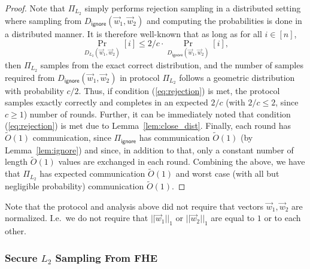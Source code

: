 \begin{proof}
Note that $\Pi_{L_2}$ simply performs rejection sampling in a distributed setting where sampling from $D_{\mathsf{ignore}}(\vec{w}_1, \vec{w}_2)$ and computing the probabilities is done in a distributed manner. It is therefore well-known that
as long as for all $i \in [n]$,
\begin{equation} \label{eq:rejection}
    \Pr_{D_{L_2}(\vec{w}_1, \vec{w}_2)}[i] \leq 2/c \cdot \Pr_{D_{\mathsf{ignore}}(\vec{w}_1, \vec{w}_2)}[i],
\end{equation}
then $\Pi_{L_2}$ samples from the exact correct distribution, and
the number of samples required from $D_{\mathsf{ignore}}(\vec{w}_1, \vec{w}_2)$ in protocol $\Pi_{L_2}$ follows a geometric distribution with probability $c/2$.
Thus, if condition (\ref{eq:rejection}) is met, the protocol 
samples exactly correctly and completes in an expected $2/c$ (with $2/c \leq 2$, since $c \ge 1$) number of rounds.   
Further, it can be immediately noted that condition (\ref{eq:rejection}) is met due to Lemma~\ref{lem:close_dist}.
Finally, each round has $\tilde{O}(1)$ communication, since $\Pi_{\mathsf{ignore}}$ has communication $\tilde{O}(1)$ (by Lemma~\ref{lem:ignore})
and since, in addition to that, only a constant number of length $\tilde{O}(1)$ values are exchanged in each round.
Combining the above, we have that $\Pi_{L_2}$ has expected
communication $\tilde{O}(1)$
and worst case (with all but negligible probability) communication $\tilde{O}(1)$.
\end{proof}

\begin{remark}
Note that the protocol and analysis above
did not require that vectors $\vec{w}_1, \vec{w}_2$ are normalized.
I.e.~we do not require that $||\vec{w}_1||_1$
or $||\vec{w}_2||_1$ are equal to $1$
or to each other.
\end{remark}

\subsubsection{Secure $L_2$ Sampling From FHE}
\label{sec:secure}

